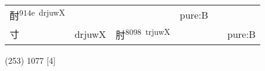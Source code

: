 \documentclass[14pt,a4paper]{scrartcl}
\begin{document}
\begin{longtable}[c]{@{}llllll@{}}
\begin{minipage}[t]{0.14\columnwidth}
酎\textsuperscript{914e~drjuwX}
\strut\end{minipage} &
\begin{minipage}[t]{0.14\columnwidth}\raggedright\strut
\strut\end{minipage} &
\begin{minipage}[t]{0.14\columnwidth}\raggedright\strut
\strut\end{minipage} &
\begin{minipage}[t]{0.14\columnwidth}\raggedright\strut
pure:B
\strut\end{minipage}\tabularnewline
\begin{minipage}[t]{0.14\columnwidth}\raggedright\strut
寸
\strut\end{minipage} &
\begin{minipage}[t]{0.14\columnwidth}\raggedright\strut
drjuwX
\strut\end{minipage} &
\begin{minipage}[t]{0.14\columnwidth}\raggedright\strut
肘\textsuperscript{8098~trjuwX}
\strut\end{minipage} &
\begin{minipage}[t]{0.14\columnwidth}\raggedright\strut
\strut\end{minipage} &
\begin{minipage}[t]{0.14\columnwidth}\raggedright\strut
\strut\end{minipage} &
\begin{minipage}[t]{0.14\columnwidth}\raggedright\strut
pure:B
\strut\end{minipage}\tabularnewline
\bottomrule
\end{longtable}

(253) 1077 {[}4{]}
\end{document}
